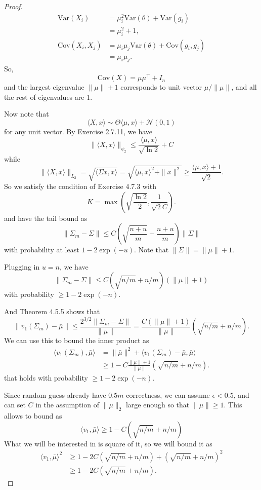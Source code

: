 \documentclass[a4paper]{article}
\newcommand*{\cN}{\mathcal{N}}
\newcommand*{\Var}{\mathrm{Var}}
\newcommand*{\Cov}{\mathrm{Cov}}
\begin{document}
\begin{proof}
  \begin{align*}
    \Var(X_i) &= \mu_i^2 \Var(\theta) + \Var(g_i)
    \\
    &= \mu_i^2 + 1,
    \\
    \Cov(X_i, X_j) &= \mu_i \mu_j \Var(\theta) + \Cov(g_i, g_j)
    \\
    &= \mu_i \mu_j.
  \end{align*}
  So, 
  \[
    \Cov(X) = \mu \mu^\intercal + I_n
  \]
  and the largest eigenvalue $\|\mu\| + 1$ corresponds to unit vector $\mu / \|\mu\|$, and all the rest of eigenvalues are 1.

  Now note that
  \[
    \langle X, x\rangle \sim \Theta \langle \mu, x\rangle + \cN(0, 1)
  \]
  for any unit vector.
  By Exercise 2.7.11, we have
  \[
    \|\langle X, x\rangle\|_{\psi_2} \le \frac{\langle \mu, x\rangle}{\sqrt{\ln 2}} + C
  \]
  while 
  \[
    \|\langle X, x\rangle\|_{L_2} = \sqrt{\langle \Sigma x, x\rangle} = \sqrt{\langle \mu, x\rangle^2 + \|x\|^2} \ge \frac{\langle \mu, x\rangle + 1}{\sqrt{2}}.
  \]
  So we satisfy the condition of Exercise 4.7.3 with
  \[
    K = \max\left( \sqrt{\frac{\ln 2}{2}}, \frac{1}{\sqrt{2} C} \right).
  \]
  and have the tail bound as
  \[
    \left\|\Sigma_m - \Sigma\right\| \le C \left( \sqrt{\frac{n + u}{m}} + \frac{n+u}{m}\right) \|\Sigma\|
  \]
  with probability at least $1 - 2 \exp(-u)$.
  Note that $\|\Sigma\| = \|\mu\| + 1$.

  Plugging in $u = n$, we have
  \[
    \|\Sigma_m -\Sigma\| \le C \left(\sqrt{n/m} + n/m\right)(\|\mu\| + 1)
  \]
  with probability $\ge 1 - 2\exp(-n)$.

  And Theorem 4.5.5 shows that
  \[
    \|v_1(\Sigma_m) - \bar{\mu}\| \le \frac{2^{3/2} \|\Sigma_m - \Sigma\|}{\|\mu\|} = \frac{C (\|\mu\| + 1)}{\|\mu\|} \left( \sqrt{n/m} + n/m\right).
  \]
  We can use this to bound the inner product as 
  \begin{align*}
    \langle v_1(\Sigma_m), \bar{\mu} \rangle &= \|\bar{\mu}\|^2 + \langle v_1(\Sigma_m) - \bar{\mu}, \bar{\mu} \rangle
    \\
    &\ge 1 - C\frac{\|\mu\| + 1}{\|\mu\|}\left( \sqrt{n/m} + n/m\right).
  \end{align*}
  that holds with probability $\ge 1 - 2 \exp(-n)$.

  Since random guess already have $0.5m$ correctness, we can assume $\epsilon < 0.5$, and can set $C$ in the assumption of $\|\mu\|_2$ large enough so that $\|\mu\| \ge 1$. 
  This allows to bound as
  \[
    \langle v_1, \bar{\mu}\rangle \ge 1 - C \left(\sqrt{n/m} + n/m \right)
  \]
  What we will be interested in is square of it, so we will bound it as
  \begin{align*}
    \langle v_1, \bar{\mu}\rangle^2 &\ge 1 - 2 C \left(\sqrt{n/m} + n/m \right) + \left(\sqrt{n/m} + n/m\right)^2
    \\
    &\ge 1 - 2 C \left(\sqrt{n/m} + n/m\right).
  \end{align*}



\end{proof}
\end{document}
